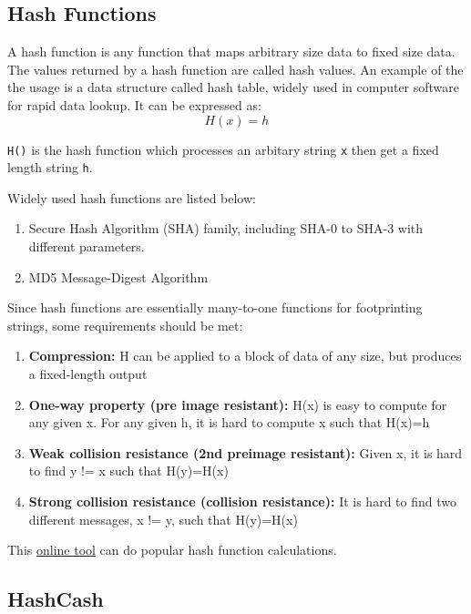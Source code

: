 \documentclass[11pt]{article}
\begin{document}
\subsection{Hash Functions}

A hash function is any function that maps arbitrary size data to fixed size data. The values returned by a hash function are called hash values. An example of the the usage is a data structure called hash table, widely used in computer software for rapid data lookup. It can be expressed as: \[ H(x) = h \]

\texttt{H()} is the hash function which processes an arbitary string \texttt{x} then get a fixed length string \texttt{h}.

Widely used hash functions are listed below:

\begin{enumerate}
\item Secure Hash Algorithm (SHA) family, including SHA-0 to SHA-3 with different parameters.
\item MD5 Message-Digest Algorithm
\end{enumerate}

Since hash functions are essentially many-to-one functions for footprinting strings, some requirements should be met: %

\begin{enumerate}
\item \textbf{Compression:}
H can be applied to a block of data of any size, but produces a fixed-length output
\item \textbf{One-way property (pre image resistant):}
H(x) is easy to compute for any given x. For any given h, it is hard to compute x such that H(x)=h
\item \textbf{Weak collision resistance (2nd preimage resistant):}
Given x, it is hard to find y != x such that H(y)=H(x)
\item \textbf{Strong collision resistance (collision resistance):}
It is hard to find two different messages, x != y, such that H(y)=H(x)
\end{enumerate}

This \href{https://www.tools4noobs.com/online_tools/hash}{online tool} can do popular hash function calculations.

\subsection{HashCash}
\end{document}
